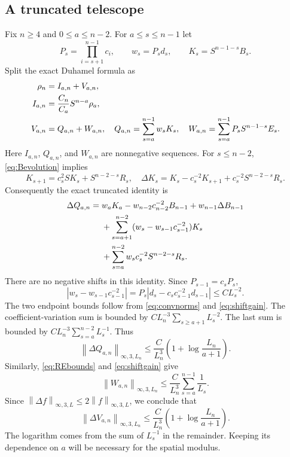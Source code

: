\documentclass[11pt,letterpaper,reqno]{amsart}
\theoremstyle{plain}
\newcommand{\norm}[1]{\left\lVert#1\right\rVert}
\begin{document}
\subsection{A truncated telescope}
Fix $n\ge4$ and $0\le a\le n-2$. For $a\le s\le n-1$ let
\[
 P_s=\prod_{i=s+1}^{n-1}c_i,\qquad w_s=P_sd_s,\qquad
 K_s=S^{n-1-s}B_s.
\]
Split the exact Duhamel formula as
\begin{align}\label{eq:split}
 \rho_n&=I_{a,n}+V_{a,n},\notag\\
 I_{a,n}&=\frac{C_n}{C_a}S^{n-a}\rho_a,\notag\\
 V_{a,n}&=Q_{a,n}+W_{a,n},\quad
 Q_{a,n}=\sum_{s=a}^{n-1}w_sK_s,\quad
 W_{a,n}=\sum_{s=a}^{n-1}P_sS^{n-1-s}E_s.
\end{align}
Here $I_{a,n}$, $Q_{a,n}$, and $W_{a,n}$ are nonnegative sequences. For $s\le n-2$, \eqref{eq:Bevolution} implies
\[
 K_{s+1}=c_s^2SK_s+S^{n-2-s}R_s,
 \quad \Delta K_s=K_s-c_s^{-2}K_{s+1}+c_s^{-2}S^{n-2-s}R_s.
\]
Consequently the exact truncated identity is
\begin{align}\label{eq:telescope}
 \Delta Q_{a,n}={}&w_aK_a-w_{n-2}c_{n-2}^{-2}B_{n-1}
   +w_{n-1}\Delta B_{n-1}\notag\\
 &+\sum_{s=a+1}^{n-2}(w_s-w_{s-1}c_{s-1}^{-2})K_s\notag\\
 &+\sum_{s=a}^{n-2}w_sc_s^{-2}S^{n-2-s}R_s.
\end{align}
There are no negative shifts in this identity. Since $P_{s-1}=c_sP_s$,
\[
 |w_s-w_{s-1}c_{s-1}^{-2}|
 =P_s|d_s-c_sc_{s-1}^{-2}d_{s-1}|\le CL_s^{-2}.
\]
The two endpoint bounds follow from \eqref{eq:convnorms} and \eqref{eq:shiftgain}. The coefficient-variation sum is bounded by $CL_n^{-3}\sum_{s\ge a+1}L_s^{-2}$. The last sum is bounded by $CL_n^{-3}\sum_{s=a}^{n-2}L_s^{-1}$. Thus
\begin{equation}\label{eq:lateQ}
 \norm{\Delta Q_{a,n}}_{\infty,3,L_n}
 \le \frac C{L_n^3}\left(1+\log\frac{L_n}{a+1}\right).
\end{equation}
Similarly, \eqref{eq:REbounds} and \eqref{eq:shiftgain} give
\[
 \norm{W_{a,n}}_{\infty,3,L_n}
 \le \frac C{L_n^3}\sum_{s=a}^{n-1}\frac1{L_s}.
\]
Since $\norm{\Delta f}_{\infty,3,L}\le2\norm f_{\infty,3,L}$, we conclude that
\begin{equation}\label{eq:lateV}
 \norm{\Delta V_{a,n}}_{\infty,3,L_n}
 \le \frac C{L_n^3}\left(1+\log\frac{L_n}{a+1}\right).
\end{equation}
The logarithm comes from the sum of $L_s^{-1}$ in the remainder. Keeping its dependence on $a$ will be necessary for the spatial modulus.
\end{document}
